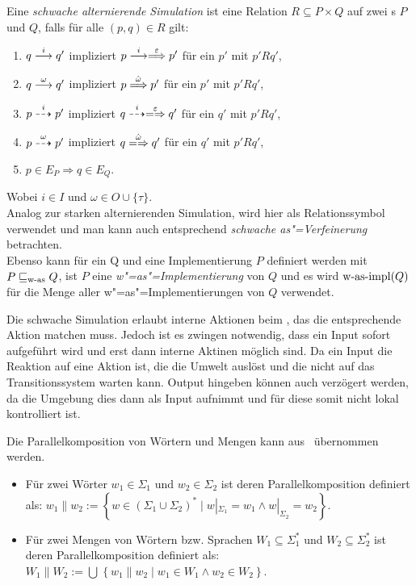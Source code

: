 \begin{Def}
  \label{wSimDef}
  Eine \emph{schwache alternierende Simulation} ist eine Relation $R\subseteq P
  \times Q$ auf zwei \MEIO{}s $P$ und $Q$, falls für alle $(p,q)\in R$ gilt:
  \begin{enumerate}
    \item $q\must[i] q'$ impliziert $p\must[i]\weakmust[\varepsilon] p'$ für
      ein $p'$ mit $p'Rq'$,
    \item $q\must[\omega] q'$ impliziert $p\weakmust[\hat{\omega}] p'$ für ein
      $p'$ mit $p'Rq'$,
    \item $p\may[i] p'$ impliziert $q\may[i]\weakmay[\varepsilon] q'$ für ein
      $q'$ mit $p'Rq'$,
    \item $p\may[\omega] p'$ impliziert $q\weakmay[\hat{\omega}] q'$ für ein
      $q'$ mit $p'Rq'$,
    \item $p\in E_P \Rightarrow q\in E_Q$.
  \end{enumerate}
  Wobei $i\in I$ und $\omega\in O\cup\{\tau\}$.\\
  Analog zur starken alternierenden Simulation, wird hier \wasRel{} als
  Relationssymbol verwendet und man kann auch entsprechend \emph{schwache
  as"=Verfeinerung} betrachten.\\
  Ebenso kann \wasRel{} für ein \MEIO{} Q und eine Implementierung $P$
  definiert werden mit $P\sqsubseteq _{\mathrm{w}\text{-}\mathrm{as}} Q$, ist $P$ eine \emph{w"=as"=Implementierung}
  von $Q$ und es wird $\mathrm{w}\text{-}\mathrm{as}\text{-}\mathrm{impl} (Q)$ für die Menge aller
  w"=as"=Implementierungen von $Q$ verwendet.
\end{Def}

Die schwache Simulation erlaubt interne Aktionen beim \MEIO{}, das die
entsprechende Aktion matchen muss. Jedoch ist es zwingen notwendig, dass ein
Input sofort aufgeführt wird und erst dann interne Aktinen möglich sind. Da
ein Input die Reaktion auf eine Aktion ist, die die Umwelt auslöst und die
nicht auf das Transitionssystem warten kann. Output hingeben können auch
verzögert werden, da die Umgebung dies dann als Input aufnimmt und für diese
somit nicht lokal kontrolliert ist.

Die Parallelkomposition von Wörtern und Mengen kann aus~\cite{Schinko2016BA}
übernommen werden.

\begin{Def}\mbox{}
  \begin{itemize}
    \item Für zwei Wörter $w_1\in\Sigma _1$ und $w_2\in\Sigma _2$ ist
      deren Parallelkomposition definiert als: $w_1\| w_2:=\left\{w\in
      (\Sigma _1\cup\Sigma _2)^*\mid w|_{\Sigma _1}=w_1\wedge w|_{\Sigma
    _2}=w_2\right\}$.
    \item Für zwei Mengen von Wörtern bzw. Sprachen $W_1\subseteq \Sigma
      ^*_1$ und $W_2\subseteq \Sigma ^*_2$ ist deren Parallelkomposition
      definiert als: $W_1\| W_2:=\bigcup\hspace{1pt}\left\{w_1\| w_2\mid
      w_1\in W_1\wedge w_2\in W_2\right\}$.
  \end{itemize}
\end{Def}


